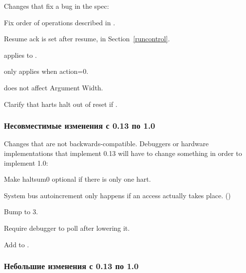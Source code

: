 \begin{steps}{Changes that fix a bug in the spec:}
    \item Fix order of operations described in \RdmSbdataZero. 
    \item Resume ack is set after resume, in Section~\ref{runcontrol}. 
    \item \FcsrTextraThirtytwoSselect applies to \FcsrTextraThirtytwoSvalue. 
    \item \FcsrTcontrolMte only applies when action=0. 
    \item \FacAccessmemoryAamsize does not affect Argument Width. 
    \item Clarify that harts halt out of reset if . 
\end{steps}

\subsubsection{Несовместимые изменения с 0.13 по 1.0}

\begin{steps}{Changes that are not backwards-compatible. Debuggers or
hardware implementations that implement 0.13 will have to change something in
order to implement 1.0:}
    \item Make haltsum0 optional if there is only one hart. 
    \item System bus autoincrement only happens if an access actually
    takes place. (\RdmSbdataZero) 
    \item Bump \FdmDmstatusVersion to 3. 
    \item Require debugger to poll \FdmDmcontrolDmactive after lowering it. 
    \item Add \FcsrIcountPending to \RcsrIcount. 
\end{steps}

\subsubsection{Небольшие изменения с 0.13 по 1.0}

